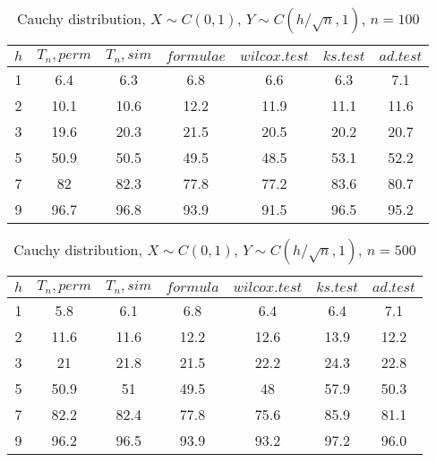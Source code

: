 \documentclass{svproc}
\begin{document}
\begin{table}[h!]
  \caption{Cauchy distribution, $X\sim C(0,1)$, $Y\sim C(h/\sqrt{n},1)$, $n=100$}
  \begin{center}
  \begin{tabular}{c@{\quad}c@{\quad}c@{\quad}c@{\quad}c@{\quad}c@{\quad}c}
  \hline
  $h$ & $T_n, perm$ & $T_n, sim$ & $formulae$ & $wilcox.test$ & $ks.test$ & $ad.test$ \\
  \hline
  1 & 6.4 & 6.3 & 6.8 & 6.6 & 6.3 & 7.1\\
  2 & 10.1 & 10.6 & 12.2 & 11.9 & 11.1 & 11.6 \\
  3 & 19.6 & 20.3 & 21.5 & 20.5 & 20.2 & 20.7 \\
  5 & 50.9 & 50.5 & 49.5 & 48.5 & 53.1 & 52.2 \\
  7 & 82 & 82.3 & 77.8 & 77.2 & 83.6 & 80.7 \\
  9 & 96.7 & 96.8 & 93.9 & 91.5 & 96.5 & 95.2 \\
  \hline
  \end{tabular}
  \end{center}
\end{table}

\begin{table}[h!]
  \caption{Cauchy distribution, $X\sim C(0,1)$, $Y\sim C(h/\sqrt{n},1)$, $n=500$}
  \begin{center}
  \begin{tabular}{c@{\quad}c@{\quad}c@{\quad}c@{\quad}c@{\quad}c@{\quad}c}
  \hline
  $h$ & $T_n, perm$ & $T_n, sim$ & $formula$ & $wilcox.test$ & $ks.test$ & $ad.test$ \\
  \hline
  1 & 5.8   & 6.1      & 6.8       & 6.4           & 6.4      & 7.1 \\
  2 & 11.6  & 11.6     & 12.2      & 12.6          & 13.9     & 12.2 \\
  3 & 21    & 21.8     & 21.5      & 22.2          & 24.3     & 22.8 \\
  5 & 50.9  & 51       & 49.5      & 48            & 57.9     & 50.3 \\
  7 & 82.2  & 82.4     & 77.8      & 75.6          & 85.9     & 81.1 \\
  9 & 96.2  & 96.5     & 93.9      & 93.2          & 97.2     & 96.0 \\
  \hline
  \end{tabular}
  \end{center}
\end{table}
\end{document}
